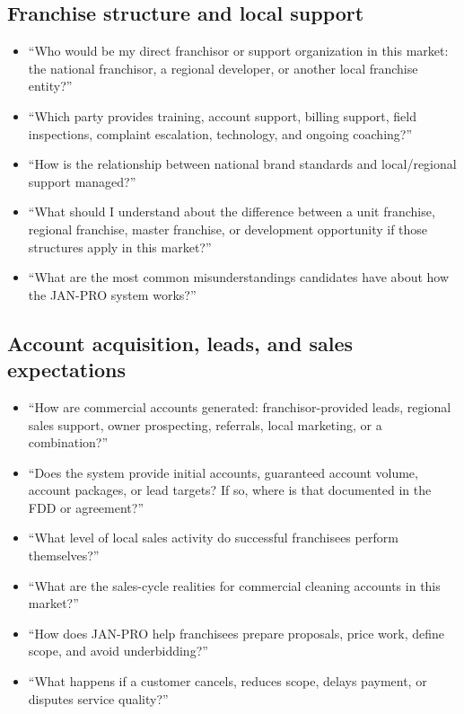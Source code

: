 \documentclass[11pt]{article}
\newcommand{\janpro}{JAN-PRO}
\begin{document}
\subsection{Franchise structure and local support}

\begin{itemize}
  \item ``Who would be my direct franchisor or support organization in this market: the national franchisor, a regional developer, or another local franchise entity?''
  \item ``Which party provides training, account support, billing support, field inspections, complaint escalation, technology, and ongoing coaching?''
  \item ``How is the relationship between national brand standards and local/regional support managed?''
  \item ``What should I understand about the difference between a unit franchise, regional franchise, master franchise, or development opportunity if those structures apply in this market?''
  \item ``What are the most common misunderstandings candidates have about how the \janpro{} system works?''
\end{itemize}

\subsection{Account acquisition, leads, and sales expectations}

\begin{itemize}
  \item ``How are commercial accounts generated: franchisor-provided leads, regional sales support, owner prospecting, referrals, local marketing, or a combination?''
  \item ``Does the system provide initial accounts, guaranteed account volume, account packages, or lead targets? If so, where is that documented in the FDD or agreement?''
  \item ``What level of local sales activity do successful franchisees perform themselves?''
  \item ``What are the sales-cycle realities for commercial cleaning accounts in this market?''
  \item ``How does \janpro{} help franchisees prepare proposals, price work, define scope, and avoid underbidding?''
  \item ``What happens if a customer cancels, reduces scope, delays payment, or disputes service quality?''
\end{itemize}
\end{document}
